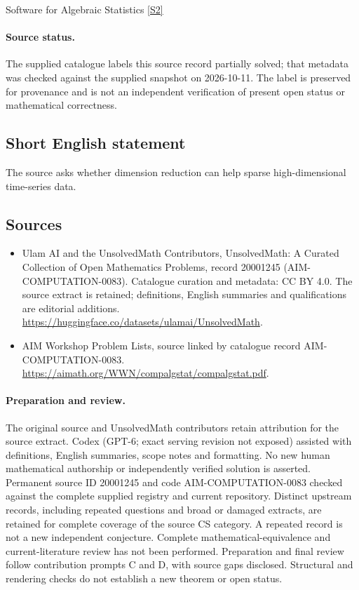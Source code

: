 \documentclass[11pt]{article}
\newcommand{\sref}[2]{\hyperlink{source:#1:#2}{[S#2]}}
\begin{document}
Software for Algebraic Statistics \sref{20001245}{2}
\paragraph{Source status.}
The supplied catalogue labels this source record partially solved; that metadata was checked against the supplied snapshot on 2026-10-11. The label is preserved for provenance and is not an independent verification of present open status or mathematical correctness.
\subsection{Short English statement}
The source asks whether dimension reduction can help sparse high-dimensional time-series data.
\subsection{Sources}
\begin{itemize}
\item[\hypertarget{source:20001245:1}{S1}] Ulam AI and the UnsolvedMath Contributors, UnsolvedMath: A Curated Collection of Open Mathematics Problems, record 20001245 (AIM-COMPUTATION-0083). Catalogue curation and metadata: CC BY 4.0. The source extract is retained; definitions, English summaries and qualifications are editorial additions.
\url{https://huggingface.co/datasets/ulamai/UnsolvedMath}.
\item[\hypertarget{source:20001245:2}{S2}] AIM Workshop Problem Lists, source linked by catalogue record AIM-COMPUTATION-0083.
\url{https://aimath.org/WWN/compalgstat/compalgstat.pdf}.
\end{itemize}
\paragraph{Preparation and review.}
The original source and UnsolvedMath contributors retain attribution for the source extract. Codex (GPT-6; exact serving revision not exposed) assisted with definitions, English summaries, scope notes and formatting. No new human mathematical authorship or independently verified solution is asserted. Permanent source ID 20001245 and code AIM-COMPUTATION-0083 checked against the complete supplied registry and current repository. Distinct upstream records, including repeated questions and broad or damaged extracts, are retained for complete coverage of the source CS category. A repeated record is not a new independent conjecture. Complete mathematical-equivalence and current-literature review has not been performed. Preparation and final review follow contribution prompts C and D, with source gaps disclosed. Structural and rendering checks do not establish a new theorem or open status.
\label{end:20001245}
\end{document}
